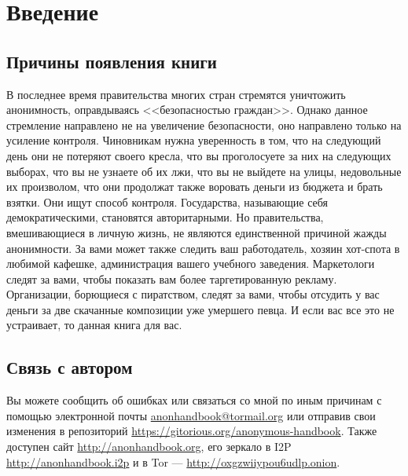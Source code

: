 \chapter{Введение}
\section{Причины появления книги}
В последнее время правительства многих стран стремятся уничтожить анонимность, оправдываясь <<безопасностью граждан>>. Однако данное стремление направлено не на увеличение безопасности, оно направлено только на усиление контроля. Чиновникам нужна уверенность в том, что на следующий день они не потеряют своего кресла, что вы проголосуете за них на следующих выборах, что вы не узнаете об их лжи, что вы не выйдете на улицы, недовольные их произволом, что они продолжат также воровать деньги из бюджета и брать взятки. Они ищут способ контроля. Государства, называющие себя демократическими, становятся авторитарными. Но правительства, вмешивающиеся в личную жизнь, не являются единственной причиной жажды анонимности. За вами может также следить ваш работодатель, хозяин хот-спота в любимой кафешке, администрация вашего учебного заведения. Маркетологи следят за вами, чтобы показать вам более таргетированную рекламу. Организации, борющиеся с пиратством, следят за вами, чтобы отсудить у вас деньги за две скачанные композиции уже умершего певца. И если вас все это не устраивает, то данная книга для вас.

\section{Связь с автором}
Вы можете сообщить об ошибках или связаться со мной по иным причинам с помощью электронной почты \href{mailto:anonhandbook@tormail.org}{anonhandbook@tormail.org} или отправив свои изменения в репозиторий \url{https://gitorious.org/anonymous-handbook}. Также доступен сайт \url{http://anonhandbook.org}, его зеркало в I2P \url{http://anonhandbook.i2p} и в Tor --- \url{http://oxgzwiiypou6udlp.onion}.
